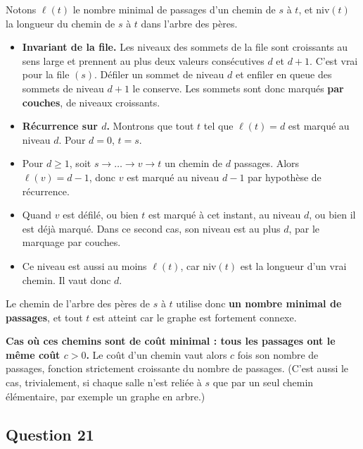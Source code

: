\documentclass[11pt,a4paper]{article}
\providecommand{\tightlist}{\setlength{\itemsep}{0pt}\setlength{\parskip}{0pt}}
\begin{document}
Notons \(\ell(t)\) le nombre minimal de passages d'un chemin de \(s\) à \(t\), et \(\mathrm{niv}(t)\) la longueur du chemin de \(s\) à \(t\) dans l'arbre des pères.

\begin{itemize}
\tightlist
\item
  \textbf{Invariant de la file.} Les niveaux des sommets de la file sont croissants au sens large et prennent au plus deux valeurs consécutives \(d\) et \(d+1\). C'est vrai pour la file \((s)\). Défiler un sommet de niveau \(d\) et enfiler en queue des sommets de niveau \(d+1\) le conserve. Les sommets sont donc marqués \textbf{par couches}, de niveaux croissants.
\item
  \textbf{Récurrence sur \(d\).} Montrons que tout \(t\) tel que \(\ell(t) = d\) est marqué au niveau \(d\). Pour \(d = 0\), \(t = s\).
\item
  Pour \(d \ge 1\), soit \(s \to \dots \to v \to t\) un chemin de \(d\) passages. Alors \(\ell(v) = d - 1\), donc \(v\) est marqué au niveau \(d-1\) par hypothèse de récurrence.
\item
  Quand \(v\) est défilé, ou bien \(t\) est marqué à cet instant, au niveau \(d\), ou bien il est déjà marqué. Dans ce second cas, son niveau est au plus \(d\), par le marquage par couches.
\item
  Ce niveau est aussi au moins \(\ell(t)\), car \(\mathrm{niv}(t)\) est la longueur d'un vrai chemin. Il vaut donc \(d\).
\end{itemize}

Le chemin de l'arbre des pères de \(s\) à \(t\) utilise donc \textbf{un nombre minimal de passages}, et tout \(t\) est atteint car le graphe est fortement connexe.

\textbf{Cas où ces chemins sont de coût minimal : tous les passages ont le même coût \(c > 0\).} Le coût d'un chemin vaut alors \(c\) fois son nombre de passages, fonction strictement croissante du nombre de passages. (C'est aussi le cas, trivialement, si chaque salle n'est reliée à \(s\) que par un seul chemin élémentaire, par exemple un graphe en arbre.)

\hypertarget{question-21}{%
\subsection{Question 21}\label{question-21}}
\end{document}
